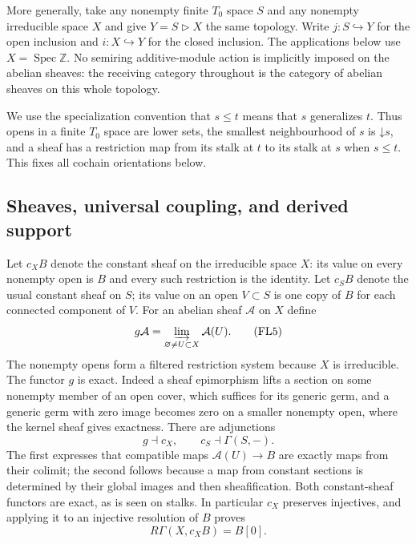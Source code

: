 \documentclass[11pt,a4paper]{article}
\theoremstyle{definition}\newtheorem{definition}[theorem]{Definition}
\newcommand{\Spec}{\operatorname{Spec}}\newcommand{\SpecMon}{\operatorname{Spec}_{\mathrm{mon}}}
\begin{document}
More generally, take any nonempty finite $T_0$ space $S$ and any
nonempty irreducible space $X$ and give $Y=S\triangleright X$ the
same topology. Write $j:S\hookrightarrow Y$ for the open inclusion
and $i:X\hookrightarrow Y$ for the closed inclusion. The applications
below use $X=\Spec\mathbb Z$. No semiring additive-module action is
implicitly imposed on the abelian sheaves: the receiving category
throughout is the category of abelian sheaves on this whole topology.

We use the specialization convention that $s\le t$ means that $s$
generalizes $t$. Thus opens in a finite $T_0$ space are lower sets,
the smallest neighbourhood of $s$ is $\mathord\downarrow s$, and a
sheaf has a restriction map from its stalk at $t$ to its stalk at $s$
when $s\le t$. This fixes all cochain orientations below.

\subsection{Sheaves, universal coupling, and derived support}

Let $c_X B$ denote the constant sheaf on the irreducible space $X$:
its value on every nonempty open is $B$ and every such restriction is
the identity. Let $c_S B$ denote the usual constant sheaf on $S$;
its value on an open $V\subset S$ is one copy of $B$ for each connected
component of $V$. For an abelian sheaf $\mathcal A$ on $X$ define
\[
 g\mathcal A=\varinjlim_{\varnothing\ne U\subset X}\mathcal A(U).
 \tag{FL5}\label{FL:eq:generic}
\]
The nonempty opens form a filtered restriction system because $X$ is
irreducible. The functor $g$ is exact. Indeed a sheaf epimorphism lifts
a section on some nonempty member of an open cover, which suffices for
its generic germ, and a generic germ with zero image becomes zero on
a smaller nonempty open, where the kernel sheaf gives exactness.
There are adjunctions
\[
 g\dashv c_X,\qquad c_S\dashv\Gamma(S,-).
 \tag{FL6}\label{FL:eq:constant-adjunctions}
\]
The first expresses that compatible maps $\mathcal A(U)\to B$ are
exactly maps from their colimit; the second follows because a map from
constant sections is determined by their global images and then
sheafification. Both constant-sheaf functors are exact, as is seen on
stalks. In particular $c_X$ preserves injectives, and applying it to
an injective resolution of $B$ proves
\[
 R\Gamma(X,c_XB)=B[0].
 \tag{FL7}\label{FL:eq:constant-acyclic}
\]
\end{document}
